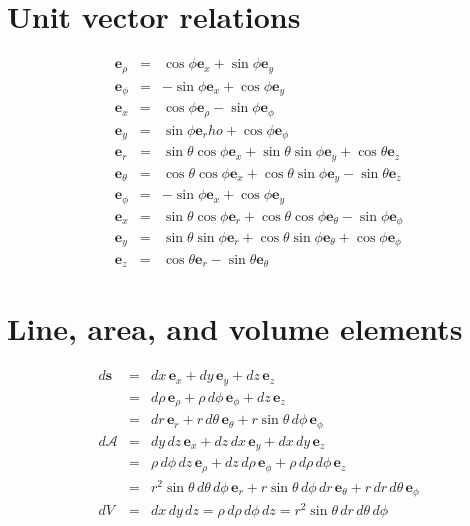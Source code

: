 \section{Unit vector relations}
\begin{eqnarray}
\mathbf{e}_\rho & = & \cos \phi \mathbf{e}_x + \sin \phi \mathbf{e}_y \\
\mathbf{e}_\phi & = & -\sin \phi \mathbf{e}_x + \cos \phi \mathbf{e}_y \\
\mathbf{e}_x & = & \cos \phi \mathbf{e}_\rho - \sin \phi \mathbf{e}_\phi \\
\mathbf{e}_y & = & \sin \phi \mathbf{e}_rho + \cos \phi \mathbf{e}_\phi \\
\mathbf{e}_r & = & \sin \theta \cos \phi \mathbf{e}_x + \sin \theta \sin \phi \mathbf{e}_y + \cos \theta \mathbf{e}_z \\
\mathbf{e}_\theta & = & \cos \theta \cos \phi \mathbf{e}_x + \cos \theta \sin \phi \mathbf{e}_y - \sin \theta \mathbf{e}_z \\
\mathbf{e}_\phi & = & -\sin \phi \mathbf{e}_x + \cos \phi \mathbf{e}_y \\
\mathbf{e}_x & = & \sin \theta \cos \phi \mathbf{e}_r + \cos \theta \cos \phi \mathbf{e}_\theta - \sin \phi \mathbf{e}_\phi \\
\mathbf{e}_y & = & \sin \theta \sin \phi \mathbf{e}_r + \cos \theta \sin \phi \mathbf{e}_\theta + \cos \phi \mathbf{e}_\phi \\
\mathbf{e}_z & = & \cos \theta \mathbf{e}_r - \sin \theta \mathbf{e}_\theta
\end{eqnarray}


\section{Line, area, and volume elements}
\begin{eqnarray}
    d \mathbf{s} & = & dx \, \mathbf{e}_x + dy \, \mathbf{e}_y + dz \, \mathbf{e}_z \\
                 & = & d\rho \, \mathbf{e}_\rho + \rho \, d\phi \, \mathbf{e}_\phi + dz \, \mathbf{e}_z \\
                 & = & dr \, \mathbf{e}_r + r \, d\theta \, \mathbf{e}_\theta + r \sin \theta \, d\phi \, \mathbf{e}_\phi \\
    d \mathcal{A} & = & dy \, dz \, \mathbf{e}_x + dz \, dx \, \mathbf{e}_y + dx \, dy \, \mathbf{e}_z \\
                  & = & \rho \, d\phi \, dz \, \mathbf{e}_\rho + dz \, d\rho \, \mathbf{e}_\phi + \rho \, d\rho \, d\phi \, \mathbf{e}_z \\
                  & = & r^2 \sin \theta \, d\theta \, d\phi \, \mathbf{e}_r + r \sin \theta \, d\phi \, dr \, \mathbf{e}_\theta + r \, dr \, d\theta \, \mathbf{e}_\phi \\
    dV & = & dx \, dy \, dz = \rho \, d\rho \, d\phi \, dz = r^2 \sin \theta \, dr \, d\theta \, d\phi
\end{eqnarray}

